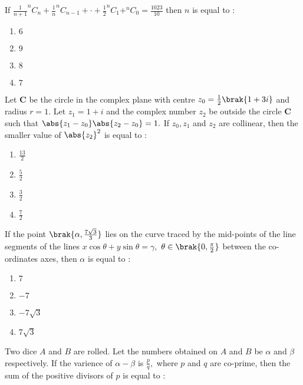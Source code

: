 \iffalse
\title{2023}
\author{EE24BTECH11008}
\section{mcq-single}
\fi
    \item If $\frac{1}{n+1}^nC_n+\frac{1}{n}^nC_{n-1}+\cdot+\frac{1}{2}^nC_1+^nC_0=\frac{1023}{10}$ then $n$ is equal to $:$
	    \hfill{}\\
    \begin{enumerate}
        \item $6$
        \item $9$
        \item $8$
        \item $7$
    \end{enumerate}
    \item Let $\textbf{C}$ be the circle in the complex plane with centre $z_0=\frac{1}{2}\brak{1+3i}$ and radius $r=1.$ Let $z_1=1+i$ and the complex number $z_2$ be outside the circle $\textbf{C}$ such that $\abs{z_1-z_0}\abs{z_2-z_0}=1.$ If $z_0,z_1$ and $z_2$ are collinear, then the smaller value of $\abs{z_2}^2$ is equal to $:$
	   \hfill{} \\
    \begin{enumerate}
        \item $\frac{13}{2}$
        \item $\frac{5}{2}$
        \item $\frac{3}{2}$
        \item $\frac{7}{2}$
    \end{enumerate}
    \item If the point $\brak{\alpha,\frac{7\sqrt{3}}{3}}$ lies on the curve traced by the mid-points of the line segments of the lines $x\cos\theta+y\sin\theta=\gamma,$ $\theta\in \brak{0,\frac{\pi}{2}}$ between the co-ordinates axes, then $\alpha$ is equal to $:$
	   \hfill{} \\
    \begin{enumerate}
        \item $7$
        \item $-7$
        \item $-7\sqrt{3}$
        \item $7\sqrt{3}$
    \end{enumerate}
    \item Two dice $A$ and $B$ are rolled. Let the numbers obtained on $A$ and $B$ be $\alpha$ and $\beta$ respectively. If the varience of $\alpha-\beta$ is $\frac{p}{q},$ where $p$ and $q$ are co-prime, then the sum of the positive divisors of $p$ is equal to $:$
